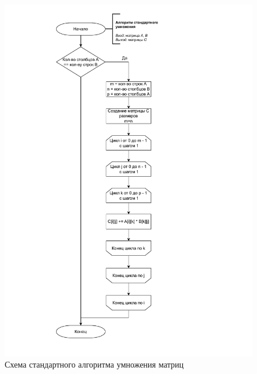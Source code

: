 \begin{figure}[h]
	\centering
	\includegraphics[height=0.9\textheight, page=1]{img/algorithms.pdf}
	\caption{Схема стандартного алгоритма умножения матриц}
	\label{fig:Stand}
\end{figure}

\clearpage

